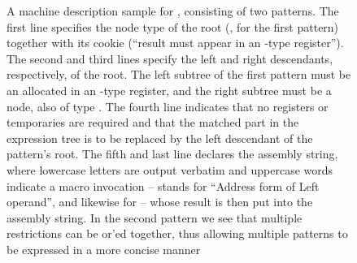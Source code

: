 \begin{figure}
  \centering%
  \begin{lstpage}{106.5mm}%
  \end{lstpage}

  \caption[A machine description sample for ]%
          {%
            A machine description sample for , consisting of
            two patterns.
            The first line specifies the node type of the root (\cCode*{+=}, for
            the first pattern) together with its cookie (``result must appear in
            an -type register'').
            The second and third lines specify the left and right descendants,
            respectively, of the root.
            The left subtree of the first pattern must be an 
            allocated in an -type register, and the right subtree must
            be a  node, also of type .
            The fourth line indicates that no registers or temporaries are
            required and that the matched part in the expression tree is to be
            replaced by the left descendant of the pattern's root.
            The fifth and last line declares the assembly string, where
            lowercase letters are output verbatim and uppercase words indicate a
            macro invocation --  stands for ``Address form of Left
            operand'', and likewise for  -- whose result is then put
            into the assembly string.
            In the second pattern we see that multiple restrictions can be
            or'ed together, thus allowing multiple patterns to be
            expressed in a more concise manner~\cite{Johnson:1981}%
          }
\end{figure}

